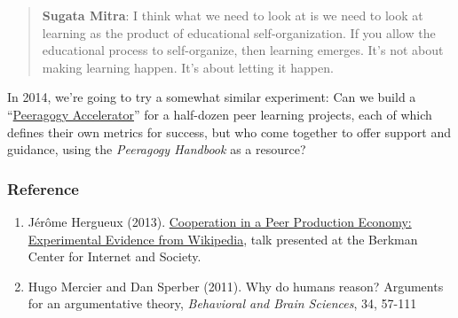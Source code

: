 \begin{quote}
\textbf{Sugata Mitra}: I think what we need to look at is we need to
look at learning as the product of educational self-organization. If you
allow the educational process to self-organize, then learning emerges.
It's not about making learning happen. It's about letting it happen.
\end{quote}
In 2014, we're going to try a somewhat similar experiment: Can we build
a
``\href{http://commonsabundance.net/docs/help-build-the-peeragogy-accelerator-work-in-progress/}{Peeragogy
Accelerator}'' for a half-dozen peer learning projects, each of which
defines their own metrics for success, but who come together to offer
support and guidance, using the \emph{Peeragogy Handbook} as a resource?

\subsubsection{Reference}

\begin{enumerate}
\item
  Jérôme Hergueux (2013).
  \href{https://cyber.law.harvard.edu/interactive/events/luncheons/2013/11/jerome}{Cooperation
  in a Peer Production Economy: Experimental Evidence from Wikipedia},
  talk presented at the Berkman Center for Internet and Society.
\item
  Hugo Mercier and Dan Sperber (2011). Why do humans reason? Arguments
  for an argumentative theory, \emph{Behavioral and Brain Sciences}, 34,
  57-111
\end{enumerate}
